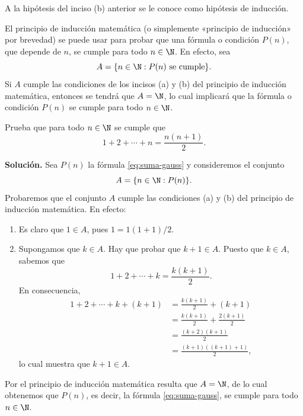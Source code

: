 \documentclass[12pt,a4paper]{book}
\begin{document}
    A la hipótesis del inciso (b) anterior se le conoce como hipótesis de inducción.

    El principio de inducción matemática (o simplemente «principio de inducción»
    por brevedad) se puede usar para probar que una fórmula o condición
    $P(n)$, que depende de $n$, se cumple para todo $n\in\N$. En efecto, sea
    \begin{equation*}
        A=\{n\in\N:P(n)\text{ se cumple}\}.
    \end{equation*}
    Si $A$ cumple las condiciones de los incisos (a) y (b) del principio de inducción
    matemática, entonces se tendrá que $A=\N$, lo cual implicará que la fórmula
    o condición $P(n)$ se cumple para todo $n\in\N$.

    \begin{ejemplo}\label{ejm:2}
        Prueba que para todo $n\in\N$ se cumple que
        \begin{equation}\label{eq:suma-gauss}
            1+2+\cdots+n=\frac{n(n+1)}{2}.
        \end{equation}

        \textbf{Solución.} Sea $P(n)$ la fórmula \eqref{eq:suma-gauss} y consideremos el conjunto
        \begin{equation*}
            A=\{n\in\N:P(n)\}.
        \end{equation*}
        Probaremos que el conjunto $A$ cumple las condiciones (a) y (b) del principio
        de inducción matemática. En efecto:
        \begin{enumerate}
            \item Es claro que $1\in A$, pues $1=1(1+1)/2$.
            \item Supongamos que $k\in A$. Hay que probar que $k+1\in A$. Puesto que $k\in A$,
            sabemos que
            \begin{equation*}
                1+2+\cdots+k=\frac{k(k+1)}{2}.
            \end{equation*}
            En consecuencia,
            \begin{align*}
                1+2+\cdots+k+(k+1)&=\frac{k(k+1)}{2}+(k+1)\\
                &=\frac{k(k+1)}{2}+\frac{2(k+1)}{2}\\
                &=\frac{(k+2)(k+1)}{2}\\
                &=\frac{(k+1)((k+1)+1)}{2},
            \end{align*}
            lo cual muestra que $k+1\in A$.
        \end{enumerate}
        Por el principio de inducción matemática resulta que $A=\N$, de lo cual
        obtenemos que $P(n)$, es decir, la fórmula \eqref{eq:suma-gauss}, se cumple para todo $n\in\N$.
    \end{ejemplo}
\end{document}
